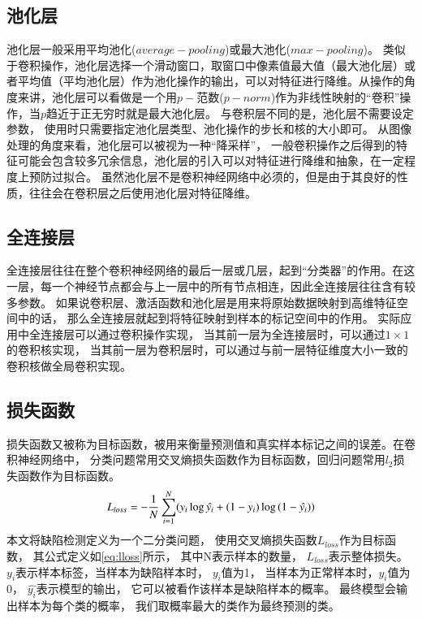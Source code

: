\subsection{池化层}

池化层一般采用平均池化($average-pooling$)或最大池化($max-pooling$)。
类似于卷积操作，池化层选择一个滑动窗口，取窗口中像素值最大值（最大池化层）或者平均值（平均池化层）作为池化操作的输出，可以对特征进行降维。从操作的角度来讲，池化层可以看做是一个用$p-$范数($p-norm$)作为非线性映射的“卷积”操作，当$p$趋近于正无穷时就是最大池化层。
与卷积层不同的是，池化层不需要设定参数，
使用时只需要指定池化层类型、池化操作的步长和核的大小即可。
从图像处理的角度来看，池化层可以被视为一种“降采样”，
一般卷积操作之后得到的特征可能会包含较多冗余信息，池化层的引入可以对特征进行降维和抽象，在一定程度上预防过拟合。
虽然池化层不是卷积神经网络中必须的，但是由于其良好的性质，往往会在卷积层之后使用池化层对特征降维。

\subsection{全连接层}

全连接层往往在整个卷积神经网络的最后一层或几层，起到“分类器”的作用。在这一层，每一个神经节点都会与上一层中的所有节点相连，因此全连接层往往含有较多参数。
如果说卷积层、激活函数和池化层是用来将原始数据映射到高维特征空间中的话，
那么全连接层就起到将特征映射到样本的标记空间中的作用。
实际应用中全连接层可以通过卷积操作实现，
当其前一层为全连接层时，可以通过$1\times 1$的卷积核实现，
当其前一层为卷积层时，可以通过与前一层特征维度大小一致的卷积核做全局卷积实现。

\subsection{损失函数}
\label{subseciont:sunshihanshu}

损失函数又被称为目标函数，被用来衡量预测值和真实样本标记之间的误差。在卷积神经网络中，
分类问题常用交叉熵损失函数作为目标函数，回归问题常用$l_2$损失函数作为目标函数。
\begin{equation}
\centering
L_{loss}=-\frac{1}{N}\sum_{i=1}^N(y_i\log{\hat{y_i}+(1-y_i)\log{(1-\hat{y_i})}})
\label{eq:lloss}
\end{equation}
本文将缺陷检测定义为一个二分类问题，
使用交叉熵损失函数$L_{loss}$作为目标函数，
其公式定义如\eqref{eq:lloss}所示，
其中N表示样本的数量，
$L_{loss}$表示整体损失。
$y_i$表示样本标签，当样本为缺陷样本时，
$y_i$值为1，
当样本为正常样本时，$y_i$值为0，
$\hat{y_i}$表示模型的输出，
它可以被看作该样本是缺陷样本的概率。
最终模型会输出样本为每个类的概率，
我们取概率最大的类作为最终预测的类。

